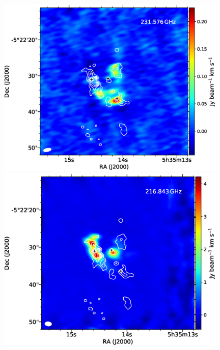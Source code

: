 \newpage

\begin{figure}[H] 
\begin{center}

\begin{minipage}{0.98\textwidth} 
\begin{center}
\begin{minipage}{0.48\textwidth}
\begin{center}
\includegraphics[width=0.98\textwidth]{OrionKL/mom0/231.576mom0_3-7.eps}
\end{center}
\end{minipage}
\begin{minipage}{0.48\textwidth}
\begin{center}
\includegraphics[width=0.98\textwidth]{OrionKL/mom0/216.843mom0_3-7.eps}
\end{center}
\end{minipage}
\end{center}
\end{minipage}


\end{center}
\end{figure}
